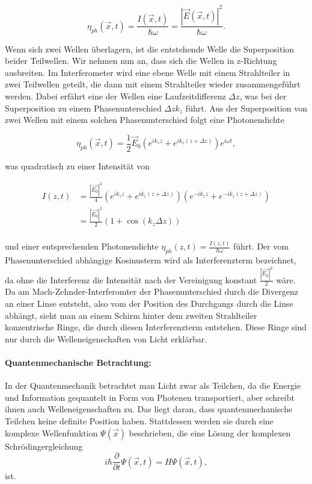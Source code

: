 \documentclass[a4paper,ngerman]{scrartcl}
\begin{document}
\begin{equation}
  \eta_{ph}(\vec{x},t) = \frac{I(\vec{x},t)}{\hbar \omega} = \frac{|\vec{E}(\vec{x},t)|^2}{\hbar \omega}.
\end{equation}

Wenn sich zwei Wellen überlagern, ist die entstehende Welle die Superposition beider Teilwellen.
Wir nehmen nun an, dass sich die Wellen in z-Richtung ausbreiten.
Im Interferometer wird eine ebene Welle mit einem Strahlteiler in zwei Teilwellen geteilt, die dann mit einem Strahlteiler wieder
zusammengeführt werden. Dabei erfährt eine der Wellen eine Laufzeitdifferenz $\Delta z$, was bei der Superposition zu
einem Phasenunterschied $\Delta z k_z$ führt. Aus der Superposition von zwei Wellen mit einem solchen Phasenunterschied
folgt eine Photonendichte

\begin{equation}
  \eta_{ph}(\vec{x},t) = \frac{1}{2} \vec{E}_0 \left( e^{i k_z z} + e^{i k_z (z + \Delta z)} \right) e^{i\omega t},
\end{equation}

was quadratisch zu einer Intensität von 

\begin{equation}
\label{eqn:intensitaet}
  \begin{split}
    I(z,t) &= \frac{|\vec{E_0}|^2 }{4} \left(e^{i k_z z} + e^{i k_z (z + \Delta z)} \right) \left(e^{-i k_z z} + e^{-i k_z (z + \Delta z)} \right)\\
    &= \frac{|\vec{E_0}|^2}{2}(1+\cos(k_z\Delta z) )\\
  \end{split}
\end{equation}

und einer entsprechenden Photonendichte $\eta_{ph}(z,t) = \frac{I(z,t)}{\hbar \omega}$ führt. Der vom Phasenunterschied abhängige
Kosinusterm wird als Interferenzterm bezeichnet, da ohne die Interferenz die Intensität nach der Vereinigung konstant $\frac{|\vec{E_0}|^2}{2}$
wäre. Da am Mach-Zehnder-Interferomter der Phasenunterschied durch die Divergenz an einer Linse entsteht, also vom der Position des Durchgangs
durch die Linse abhängt, sieht man an einem Schirm hinter dem zweiten Strahlteiler konzentrische Ringe, die durch diesen Interferenzterm
entstehen. Diese Ringe sind nur durch die Welleneigenschaften von Licht erklärbar.

\paragraph{Quantenmechanische Betrachtung:}
In der Quantenmechanik betrachtet man Licht zwar als Teilchen, da die Energie und Information gequantelt in Form von Photenen
transportiert, aber schreibt ihnen auch Welleneigenschaften zu. Das liegt daran, dass quantenmechanische Teilchen keine definite
Position haben. Stattdessen werden sie durch eine komplexe Wellenfunktion $\Psi(\vec{x})$ beschrieben, die eine Lösung der
komplexen Schrödingergleichung 
\begin{equation}
  i \hbar \frac{\partial}{\partial t} \Psi(\vec{x},t) = H \Psi(\vec{x},t),
\end{equation}
ist.
\end{document}
